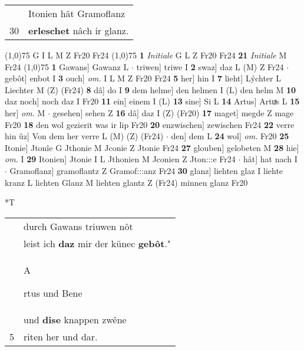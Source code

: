 \documentclass[8pt,a4paper,notitlepage]{article}
\begin{document}
\begin{table}[ht]
\begin{minipage}[t]{0.5\linewidth}
\begin{tabular}{rl}
 & Itonien hât Gramoflanz\\ 
30 & \textbf{erleschet} nâch ir glanz.\\ 
\end{tabular}
\scriptsize
\line(1,0){75} \newline
G I L M Z Fr20 Fr24 \newline
\line(1,0){75} \newline
\textbf{1} \textit{Initiale} G L Z Fr20 Fr24  \textbf{21} \textit{Initiale} M Fr24  \newline
\line(1,0){75} \newline
\textbf{1} Gawans] Gawanz L  $\cdot$ triwen] triwe I \textbf{2} swaz] daz L (M) Z Fr24  $\cdot$ gebôt] enbot I \textbf{3} ouch] \textit{om.} I L M Z Fr20 Fr24 \textbf{5} her] hin I \textbf{7} lieht] Lýchter L Liechter M (Z) (Fr24) \textbf{8} dâ] do I \textbf{9} dem helme] den helmen I (L) den helm M \textbf{10} daz noch] noch daz I Fr20 \textbf{11} ein] einem I (L) \textbf{13} sine] Si L \textbf{14} Artus] Artuͯs L \textbf{15} her] \textit{om.} M  $\cdot$ gesehen] sehen Z \textbf{16} dâ] daz I (Z) (Fr20) \textbf{17} maget] megde Z mage Fr20 \textbf{18} den wol gezierit was ir lip Fr20 \textbf{20} enzwischen] zewischen Fr24 \textbf{22} verre hin ûz] Von dem her verre L (M) (Z) (Fr24)  $\cdot$ den] dem L \textbf{24} wol] \textit{om.} Fr20 \textbf{25} Itonie] Jtonîe G Jthonie M Jconie Z Jtonie Fr24 \textbf{27} glouben] gelobeten M \textbf{28} hie] \textit{om.} I \textbf{29} Itonien] Jtonie I L Jthonien M Jconien Z Jton:::e Fr24  $\cdot$ hât] hat nach I  $\cdot$ Gramoflanz] gramoflantz Z Gramof:::anz Fr24 \textbf{30} glanz] liehten glaz I liehte kranz L lichten Glanz M liehten glantz Z (Fr24) minnen glanz Fr20 \newline
\end{minipage}
\hspace{0.5cm}
\begin{minipage}[t]{0.5\linewidth}
\small
\begin{center}*T
\end{center}
\begin{tabular}{rl}
 & durch Gawans triuwen nôt\\ 
 & leist ich \textbf{daz} mir der künec \textbf{gebôt}."\\ 
 & \begin{large}A\end{large}rtus und Bene\\ 
 & und \textbf{dise} knappen zwêne\\ 
5 & riten her und dar.\\ 

\end{tabular}
\end{minipage}
\end{table}
\end{document}

